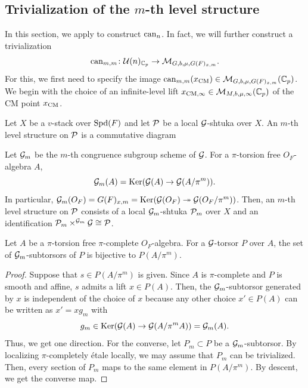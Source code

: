 \documentclass[12pt,reqno]{amsart}
\begin{document}
\subsection{Trivialization of the $m$-th level structure} 

In this section, we apply  to construct ${\operatorname{can}}_n$. In fact, we will further construct a trivialization 
\[
    {\operatorname{can}}_{m, m} \colon {\mathcal{U}}(n)_{\mathbb{C}_p} \to {\mathcal{M}}_{G, b, \mu, G(F)_{x, m}}. 
\]
For this, we first need to specify the image ${\operatorname{can}}_{m, m}(x_{\operatorname{CM}}) \in {\mathcal{M}}_{G, b, \mu, G(F)_{x, m}}(\mathbb{C}_p)$. We begin with the choice of an infinite-level lift $x_{{\operatorname{CM}}, \infty} \in {\mathcal{M}}_{M, b, \mu, \infty}(\mathbb{C}_p)$ of the CM point $x_{\operatorname{CM}}$. 


\begin{defi}
    Let $X$ be a $v$-stack over ${\operatorname{Spd}}(F)$ and let ${\mathcal{P}}$ be a local ${\mathcal{G}}$-shtuka over $X$. An $m$-th level structure on ${\mathcal{P}}$ is a commutative diagram
    \begin{center}
    \end{center}
\end{defi}

Let ${\mathcal{G}}_m$ be the $m$-th congruence subgroup scheme of ${\mathcal{G}}$. For a $\pi$-torsion free $O_F$-algebra $A$, 
\[
    {\mathcal{G}}_m(A) = {\operatorname{Ker}}({\mathcal{G}}(A) \to {\mathcal{G}}(A / \pi^m)). 
\]
In particular, ${\mathcal{G}}_m(O_F) = G(F)_{x, m} = {\operatorname{Ker}}({\mathcal{G}}(O_F) \twoheadrightarrow {\mathcal{G}}(O_F / \pi^m))$. Then, an $m$-th level structure on ${\mathcal{P}}$ consists of a local ${\mathcal{G}}_m$-shtuka ${\mathcal{P}}_m$ over $X$ and an identification ${\mathcal{P}}_m \times^{{\mathcal{G}}_m} {\mathcal{G}} \cong {\mathcal{P}}$. 

\begin{lem} \label{lem:Gpsubtors}
    Let $A$ be a $\pi$-torsion free $\pi$-complete $O_F$-algebra. For a ${\mathcal{G}}$-torsor $P$ over $A$, the set of ${\mathcal{G}}_m$-subtorsors of $P$ is bijective to $P(A / \pi^m)$. 
\end{lem}
\begin{proof}
    Suppose that $s \in P(A / \pi^m)$ is given. Since $A$ is $\pi$-complete and $P$ is smooth and affine, $s$ admits a lift $x\in P(A)$. Then, the ${\mathcal{G}}_m$-subtorsor generated by $x$ is independent of the choice of $x$ because any other choice $x'\in P(A)$ can be written as $x' = x g_m$ with
    \[
        g_m \in {\operatorname{Ker}}({\mathcal{G}}(A) \to {\mathcal{G}}(A / \pi^m A)) = {\mathcal{G}}_m(A). 
    \]
    Thus, we get one direction. For the converse, let $P_m \subset P$ be a ${\mathcal{G}}_m$-subtorsor. By localizing $\pi$-completely \'{e}tale locally, we may assume that $P_m$ can be trivialized. Then, every section of $P_m$ maps to the same element in $P(A / \pi^m)$. By descent, we get the converse map. 
\end{proof}
\end{document}
